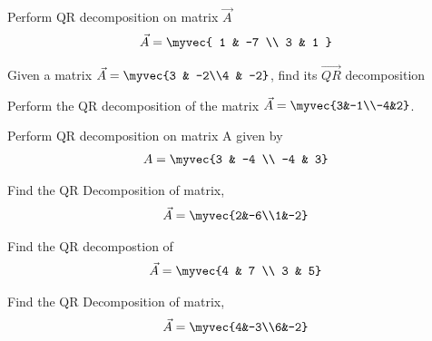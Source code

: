 \solution

%
\item  Perform QR decomposition on matrix $\vec{A}$
\begin{align}
    \vec{A}=\myvec{ 1 & -7 \\ 3 & 1 }\label{eq:solutions/decomp/2/22/givmat}
\end{align}
\solution

%
\item Given a matrix $\vec{A} = \myvec{3 & -2\\4 & -2}$, find its $\vec{QR}$ decomposition
%
\solution

\item Perform the QR decomposition of the matrix $\vec{A}=\myvec{3&-1\\-4&2}$.
\solution

\item Perform QR decomposition on matrix A given by
\begin{align*}
	A = \myvec{3 & -4 \\ -4 & 3} 
\end{align*}

\solution

\item Find the QR Decomposition of matrix,
\begin{align}
\vec{A} = \myvec{2&-6\\1&-2}
\label{eq:solutions/decomp/2/26/Q}
\end{align}
\solution

%
\item Find the QR decompostion of 
\begin{align} 
    \vec{A} = \myvec{4 & 7 \\ 3 & 5}
\end{align}
%
\solution

\item Find the QR Decomposition of matrix,
\begin{align}
\vec{A} = \myvec{4&-3\\6&-2}
\label{eq:solutions/decomp/2/28/Q}
\end{align}
%
\solution


